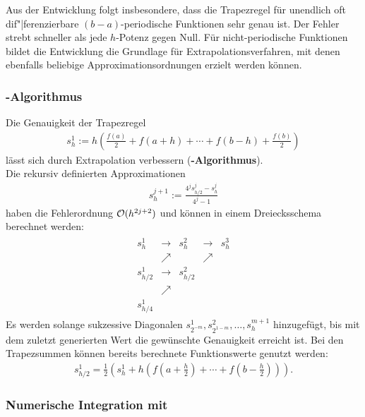 Aus der Entwicklung folgt insbesondere, dass die Trapezregel für unendlich oft
dif"|ferenzierbare $(b - a)$-periodische Funktionen sehr genau ist.
Der Fehler strebt schneller als jede $h$-Potenz gegen Null.
Für nicht-periodische Funktionen bildet die Entwicklung die Grundlage für
Extrapolationsverfahren, mit denen ebenfalls beliebige
Approximationsordnungen erzielt werden können. 

\subsubsection{%
    -Algorithmus%
}

Die Genauigkeit der Trapezregel
\begin{align*}
    s_h^1 := h \left(\frac{f(a)}{2} + f(a + h) + \dotsb +
    f(b - h) + \frac{f(b)}{2}\right)
\end{align*}
lässt sich durch Extrapolation verbessern
(\textbf{-Algorithmus}). \\
Die rekursiv definierten Approximationen
\begin{align*}
    s_h^{j+1} := \frac{4^j s_{h/2}^j - s_h^j}{4^j - 1}
\end{align*}
haben die Fehlerordnung $\mathcal{O}(h^{2j+2})$ und können in einem Dreiecksschema
berechnet werden:
\begin{align*}
    \begin{array}{ccccc}
        s_h^1 & \rightarrow & s_h^2 & \rightarrow & s_h^3 \\
        & \nearrow & & \nearrow \\
        s_{h/2}^1 & \rightarrow & s_{h/2}^2 \\
        & \nearrow \\
        s_{h/4}^1
    \end{array}
\end{align*}
Es werden solange sukzessive Diagonalen
$s_{2^{-m}}^1, s_{2^{1-m}}^2, \dotsc, s_h^{m+1}$ hinzugefügt, bis mit dem
zuletzt generierten Wert die gewünschte Genauigkeit erreicht ist.
Bei den Trapezsummen können bereits berechnete Funktionswerte genutzt werden:
\begin{align*}
    s_{h/2}^1 = \frac{1}{2} \left(s_h^1 +
    h \left(f(a + \tfrac{h}{2}) + \dotsb +
    f\left(b - \tfrac{h}{2}\right)\right)\right).
\end{align*}

\pagebreak

\subsubsection{%
    Numerische Integration mit \matlab{}%
}

